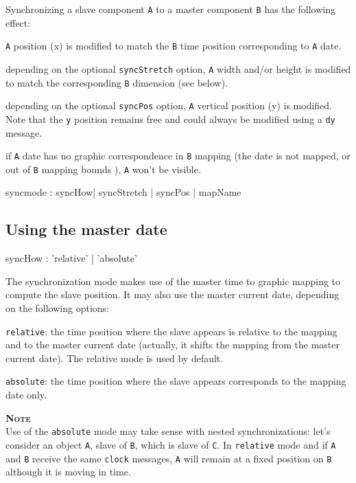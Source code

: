 \documentclass[a4paper,twoside]{report}
\newcommand{\subsublevel}[1]	{\subsection{#1}}
\newcommand{\OSC}[1]		{\texttt{#1}}
\newcommand{\values}[1]		{\texttt{#1}}
\newcommand{\note}	[1]		{\vspace{2mm}\textbf{\hspace{-1.03cm}\textbf{\textsc{Note #1}}}}
\let\olditemize\itemize
\let\oldenditemize\enditemize
\renewenvironment{itemize} 	{\olditemize \setlength{\itemsep}{1mm}}{\oldenditemize}
\begin{document}
Synchronizing a slave component \values{A} to a master component \values{B} has the following effect:
\begin{itemize}
\item \values{A} position (x) is modified to match the \values{B} time position corresponding to \values{A} date.
\item depending on the optional \OSC{syncStretch} option, \values{A} width and/or height is modified to match the  corresponding \values{B} dimension (see below).
\item depending on the optional \OSC{syncPos} option, \values{A} vertical position (y) is modified. Note that the \OSC{y} position remains free and could always be modified using a \OSC{dy} message.
\item if \values{A} date has no graphic correspondence in \values{B} mapping (the date is not mapped, or out of \values{B} mapping bounds ), \values{A} won't be visible.
\end{itemize}

\begin{rail}
syncmode : syncHow| syncStretch | syncPos | mapName
\end{rail}

\subsublevel{Using the master date}
\begin{rail}
syncHow : 'relative' | 'absolute'
\end{rail}

The synchronization mode makes use of the master time to graphic mapping to compute the slave position. It may also use the master current date, depending on the following options:
\begin{itemize}
\item \OSC{relative}: the time position where the slave appears is relative to the mapping and to the master current date (actually, it shifts the mapping from the master current date). The relative mode is used by default.
\item \OSC{absolute}: the time position where the slave appears corresponds to the mapping date only.
\end{itemize}

\note{} \\
Use of the \OSC{absolute} mode may take sense with nested synchronizations: let's consider an object \values{A}, slave of \values{B}, which is slave of \values{C}.
In \OSC{relative} mode and if \values{A} and \values{B} receive the same \OSC{clock} messages, \values{A} will remain at a fixed position on \values{B} although it is moving in time.
\end{document}

